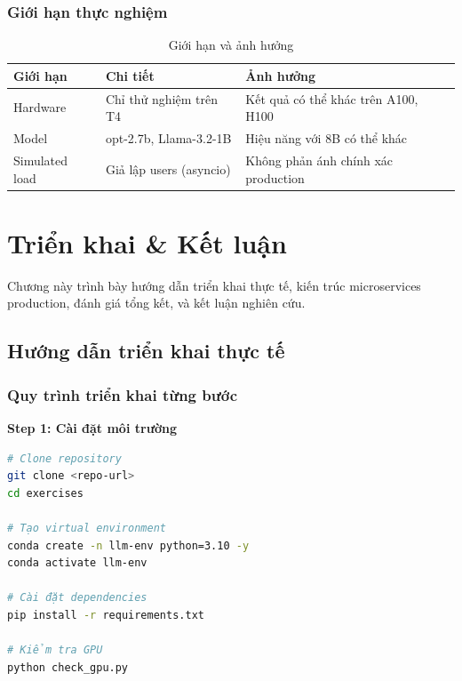 \documentclass[12pt,a4paper]{report}
\begin{document}
\subsection{Giới hạn thực nghiệm}

\begin{table}[h]
\centering
\caption{Giới hạn và ảnh hưởng}
\label{tab:limitations}
\begin{tabular}{p{3cm}p{5cm}p{4.5cm}}
\toprule
\textbf{Giới hạn} & \textbf{Chi tiết} & \textbf{Ảnh hưởng} \\
\midrule
Hardware & Chỉ thử nghiệm trên T4 & Kết quả có thể khác trên A100, H100 \\
Model & opt-2.7b, Llama-3.2-1B & Hiệu năng với 8B có thể khác \\
Simulated load & Giả lập users (asyncio) & Không phản ánh chính xác production \\
\bottomrule
\end{tabular}
\end{table}

\newpage

\chapter{Triển khai \& Kết luận}

Chương này trình bày hướng dẫn triển khai thực tế, kiến trúc microservices production, đánh giá tổng kết, và kết luận nghiên cứu.

\section{Hướng dẫn triển khai thực tế}

\subsection{Quy trình triển khai từng bước}

\textbf{Step 1: Cài đặt môi trường}

\begin{lstlisting}[language=bash,caption={Cài đặt môi trường}]
# Clone repository
git clone <repo-url>
cd exercises

# Tạo virtual environment
conda create -n llm-env python=3.10 -y
conda activate llm-env

# Cài đặt dependencies
pip install -r requirements.txt

# Kiểm tra GPU
python check_gpu.py
\end{lstlisting}
\end{document}
